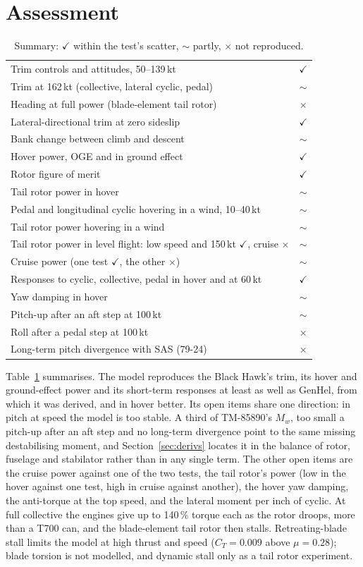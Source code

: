 \documentclass[10pt,a4paper,twocolumn]{article}
\newcommand{\ok}{\textcolor{green!45!black}{\ensuremath{\checkmark}}}
\newcommand{\nok}{\textcolor{red!70!black}{\ensuremath{\times}}}
\newcommand{\pok}{\textcolor{orange!85!black}{\ensuremath{\sim}}}
\begin{document}
\section{Assessment}\label{sec:assess}
\begin{table}[t]
\centering\small
\caption{Summary: \ok{} within the test's scatter, \pok{} partly, \nok{} not reproduced.}\label{tab:score}
\begin{tabularx}{\columnwidth}{@{}>{\raggedright\arraybackslash}Xc@{}}
\toprule
Trim controls and attitudes, 50--139\,kt & \ok \\
Trim at 162\,kt (collective, lateral cyclic, pedal) & \pok \\
Heading at full power (blade-element tail rotor) & \nok \\
Lateral-directional trim at zero sideslip & \ok \\
Bank change between climb and descent & \pok \\
Hover power, OGE and in ground effect & \ok \\
Rotor figure of merit & \ok \\
Tail rotor power in hover & \pok \\
Pedal and longitudinal cyclic hovering in a wind, 10--40\,kt & \pok \\
Tail rotor power hovering in a wind & \pok \\
Tail rotor power in level flight: low speed and 150\,kt \ok, cruise \nok & \pok \\
Cruise power (one test \ok, the other \nok) & \pok \\
Responses to cyclic, collective, pedal in hover and at 60\,kt & \ok \\
Yaw damping in hover & \pok \\
Pitch-up after an aft step at 100\,kt & \pok \\
Roll after a pedal step at 100\,kt & \nok \\
Long-term pitch divergence with SAS (79-24) & \nok \\
\bottomrule
\end{tabularx}
\end{table}
Table~\ref{tab:score} summarises. The model reproduces the Black Hawk's trim, its hover and ground-effect power and its short-term
responses at least as well as GenHel, from which it was derived, and in hover better. Its open items share one direction: in
pitch at speed the model is too stable. A third of TM-85890's $M_w$, too small a pitch-up after an aft step and no long-term divergence
point to the same missing destabilising moment, and Section~\ref{sec:derivs} locates it in the balance of rotor, fuselage and stabilator rather than in
any single term. The other open items are the cruise power against one of the two tests, the tail rotor's power (low in the hover
against one test, high in cruise against another), the hover yaw damping, the anti-torque at the top speed, and the lateral moment per inch
of cyclic. At full collective the engines give up to 140\,\% torque each as the rotor droops, more than a T700 can, and the
blade-element tail rotor then stalls. Retreating-blade stall limits the
model at high thrust and speed ($C_T=0.009$ above $\mu=0.28$); blade torsion is not modelled, and dynamic stall only as a tail rotor experiment.
\end{document}
